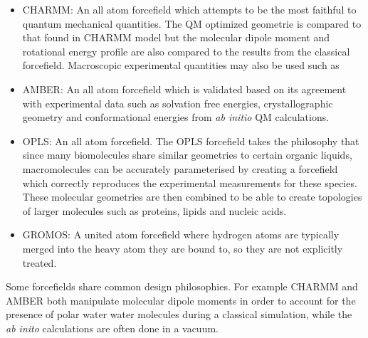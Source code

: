 \begin{itemize}
	\item CHARMM: An all atom forcefield which attempts to be the most faithful to quantum mechanical quantities. The QM optimized geometrie is compared to that found in CHARMM model but the molecular dipole moment and rotational energy profile are also compared to the results from the classical forcefield. Macroscopic experimental quantities may also be used such as 
	\item AMBER: An all atom forcefield which is validated based on its agreement with experimental data such as solvation free energies, crystallographic geometry and conformational energies from \textit{ab initio} QM calculations.
	\item OPLS: An all atom forcefield. The OPLS forcefield takes the philosophy that since many biomolecules share similar geometries to certain organic liquids, macromolecules can be accurately parameterised by creating a forcefield which correctly reproduces the experimental measurements for these species. These molecular geometries are then combined to be able to create topologies of larger molecules such as proteins, lipids and nucleic acids.
	\item GROMOS: A united atom forcefield where hydrogen atoms are typically merged into the heavy atom they are bound to, so they are not explicitly treated.

\end{itemize}
Some forcefields share common design philosophies. For example CHARMM and AMBER both manipulate molecular dipole moments in order to account for the presence of polar water water molecules during a classical simulation, while the \textit{ab inito} calculations are often done in a vacuum.


